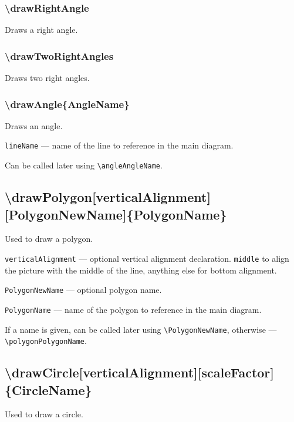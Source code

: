 \documentclass{ltxdoc}
\begin{document}

\subsubsection{\textbackslash drawRightAngle}

	Draws a right angle.

\subsubsection{\textbackslash drawTwoRightAngles}

	Draws two right angles.


\subsubsection{\textbackslash drawAngle\{AngleName\}}

	Draws an angle.

	\texttt{lineName} — name of the line to reference in the main diagram. 
	
	Can be called later using \texttt{\textbackslash angleAngleName}.
	
	
\subsection{\textbackslash drawPolygon[verticalAlignment][PolygonNewName]\{PolygonName\}}

	Used to draw a polygon.

	\texttt{verticalAlignment} — optional vertical alignment declaration. \texttt{middle} to align the picture with the middle of the line, anything else for bottom alignment.

	\texttt{PolygonNewName} — optional polygon name. 
	
	\texttt{PolygonName} — name of the polygon to reference in the main diagram. 
	
	If a name is given, can be called later using \texttt{\textbackslash PolygonNewName}, otherwise — \texttt{\textbackslash polygonPolygonName}. 
	
\subsection{\textbackslash drawCircle[verticalAlignment][scaleFactor]\{CircleName\}}

	Used to draw a circle.
\end{document}
